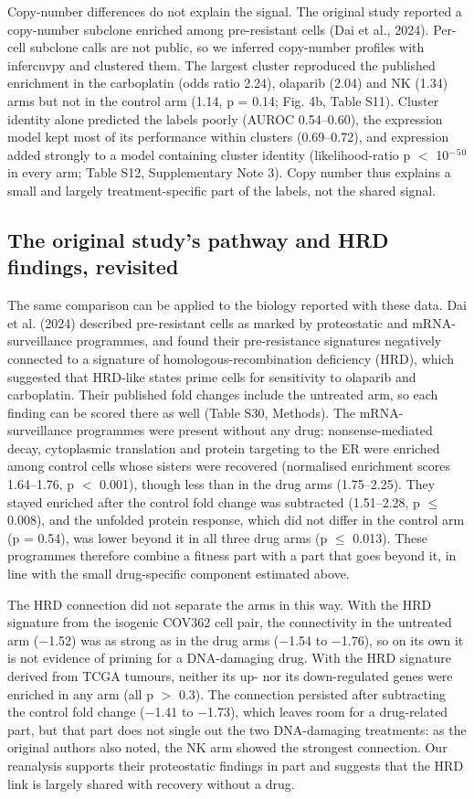 \documentclass[11pt,a4paper]{article}
\begin{document}
Copy-number differences do not explain the signal. The original study reported a copy-number subclone enriched among pre-resistant cells (Dai et al., 2024). Per-cell subclone calls are not public, so we inferred copy-number profiles with infercnvpy and clustered them. The largest cluster reproduced the published enrichment in the carboplatin (odds ratio 2.24), olaparib (2.04) and NK (1.34) arms but not in the control arm (1.14, p = 0.14; Fig. 4b, Table S11). Cluster identity alone predicted the labels poorly (AUROC 0.54--0.60), the expression model kept most of its performance within clusters (0.69--0.72), and expression added strongly to a model containing cluster identity (likelihood-ratio p $<$ 10$^-$$^5$$^0$ in every arm; Table S12, Supplementary Note 3). Copy number thus explains a small and largely treatment-specific part of the labels, not the shared signal.

\subsection*{The original study's pathway and HRD findings, revisited}

The same comparison can be applied to the biology reported with these data. Dai et al. (2024) described pre-resistant cells as marked by proteostatic and mRNA-surveillance programmes, and found their pre-resistance signatures negatively connected to a signature of homologous-recombination deficiency (HRD), which suggested that HRD-like states prime cells for sensitivity to olaparib and carboplatin. Their published fold changes include the untreated arm, so each finding can be scored there as well (Table S30, Methods). The mRNA-surveillance programmes were present without any drug: nonsense-mediated decay, cytoplasmic translation and protein targeting to the ER were enriched among control cells whose sisters were recovered (normalised enrichment scores 1.64--1.76, p $<$ 0.001), though less than in the drug arms (1.75--2.25). They stayed enriched after the control fold change was subtracted (1.51--2.28, p $\leq$ 0.008), and the unfolded protein response, which did not differ in the control arm (p = 0.54), was lower beyond it in all three drug arms (p $\leq$ 0.013). These programmes therefore combine a fitness part with a part that goes beyond it, in line with the small drug-specific component estimated above.

The HRD connection did not separate the arms in this way. With the HRD signature from the isogenic COV362 cell pair, the connectivity in the untreated arm ($-$1.52) was as strong as in the drug arms ($-$1.54 to $-$1.76), so on its own it is not evidence of priming for a DNA-damaging drug. With the HRD signature derived from TCGA tumours, neither its up- nor its down-regulated genes were enriched in any arm (all p $>$ 0.3). The connection persisted after subtracting the control fold change ($-$1.41 to $-$1.73), which leaves room for a drug-related part, but that part does not single out the two DNA-damaging treatments: as the original authors also noted, the NK arm showed the strongest connection. Our reanalysis supports their proteostatic findings in part and suggests that the HRD link is largely shared with recovery without a drug.
\end{document}
